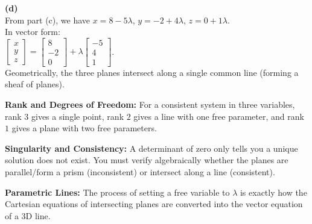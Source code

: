 \begin{solution}
\medskip
\textbf{(d)} \\
From part (c), we have $x = 8 - 5\lambda$, $y = -2 + 4\lambda$, $z = 0 + 1\lambda$. \\
In vector form: \\
$\begin{bmatrix} x \\ y \\ z \end{bmatrix} = \begin{bmatrix} 8 \\ -2 \\ 0 \end{bmatrix} + \lambda \begin{bmatrix} -5 \\ 4 \\ 1 \end{bmatrix}$. \\
Geometrically, the three planes intersect along a single common line (forming a sheaf of planes).
\end{solution}

\begin{takeaways}
\item \textbf{Rank and Degrees of Freedom:} For a consistent system in three variables, rank $3$ gives a single point, rank $2$ gives a line with one free parameter, and rank $1$ gives a plane with two free parameters.
\item \textbf{Singularity and Consistency:} A determinant of zero only tells you a unique solution does not exist. You must verify algebraically whether the planes are parallel/form a prism (inconsistent) or intersect along a line (consistent).
\item \textbf{Parametric Lines:} The process of setting a free variable to $\lambda$ is exactly how the Cartesian equations of intersecting planes are converted into the vector equation of a 3D line.
\end{takeaways}


